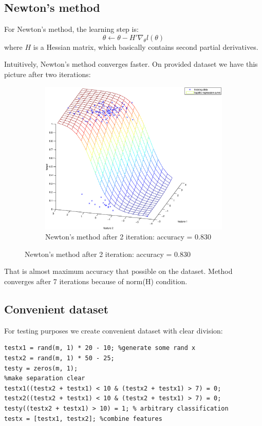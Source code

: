 \documentclass{article}
\begin{document}
	\subsection{Newton's method}
	For Newton's method, the learning step is:
	$$\theta \leftarrow \theta - H'  \nabla_\theta l(\theta)$$
	where $H$ is a Hessian matrix, which basically contains second partial derivatives. 
	
	Intuitively, Newton's method converges faster. On provided dataset we have this picture after two iterations:
	\begin{figure}[h]
		\centering
		\begin{subfigure}{.5\textwidth}
			\centering
			\includegraphics[width=.9\linewidth]{lr_provided_start_newton_2.eps}
			\caption{Newton's method after 2 iteration: accuracy = 0.830}
			\label{fig:sub1}
		\end{subfigure}%
	\end{figure}	
	That is almost maximum accuracy that possible on the dataset. Method converges after 7 iterations because of norm(H) condition. 
	
	\subsection{Convenient dataset}
	For testing purposes we create convenient dataset with clear division:
	\pagebreak
	\begin{lstlisting}[frame=single,basicstyle=\ttfamily]
testx1 = rand(m, 1) * 20 - 10; %generate some rand x
testx2 = rand(m, 1) * 50 - 25;
testy = zeros(m, 1);
%make separation clear
testx1((testx2 + testx1) < 10 & (testx2 + testx1) > 7) = 0; 
testx2((testx2 + testx1) < 10 & (testx2 + testx1) > 7) = 0;
testy((testx2 + testx1) > 10) = 1; % arbitrary classification   
testx = [testx1, testx2]; %combine features
	\end{lstlisting}
	
\end{document}
